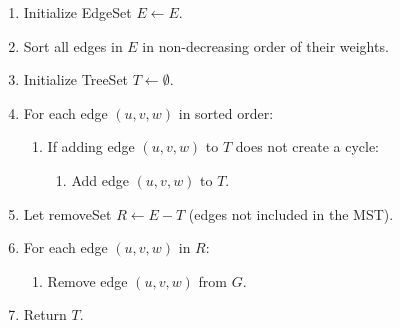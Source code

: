 \documentclass[a4paper]{exam}
\begin{document}
\begin{questions}
\begin{parts}
\begin{solution}
      \begin{enumerate}
        \item Initialize EdgeSet $E \leftarrow E$.
        \item Sort all edges in $E$ in non-decreasing order of their weights.
        \item Initialize TreeSet $T \leftarrow \emptyset$.
        \item For each edge $(u, v, w)$ in sorted order:
        \begin{enumerate}
            \item If adding edge $(u, v, w)$ to $T$ does not create a cycle:
            \begin{enumerate}
                \item Add edge $(u, v, w)$ to $T$.
            \end{enumerate}
        \end{enumerate}
        \item Let removeSet $R \leftarrow E - T$ (edges not included in the MST).
        \item For each edge $(u, v, w)$ in $R$:
        \begin{enumerate}
            \item Remove edge $(u, v, w)$ from $G$.
        \end{enumerate}
        \item Return $T$.
    \end{enumerate}
    
    \end{solution}

\end{parts}
\end{questions}
\end{document}

